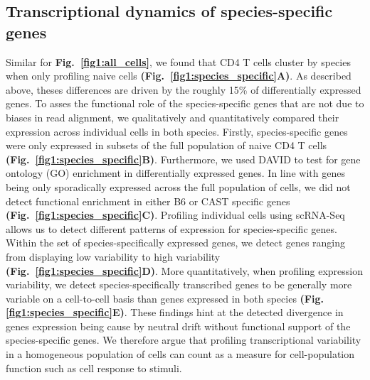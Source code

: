 \subsection{Transcriptional dynamics of species-specific genes}
\label{sec1:species-spec-dynamics}

Similar for \textbf{Fig.~\ref{fig1:all_cells}}, we found that CD4\plus{} T cells cluster by species when only profiling naive cells \textbf{(Fig.~\ref{fig1:species_specific}A)}. As described above, theses differences are driven by the roughly 15\% of differentially expressed genes. To asses the functional role of the species-specific genes that are not due to biases in read alignment, we qualitatively and quantitatively compared their expression across individual cells in both species. Firstly, species-specific genes were only expressed in subsets of the full population of naive CD4\plus{} T cells \textbf{(Fig.~\ref{fig1:species_specific}B)}. Furthermore, we used DAVID \citep{Dennis2003} to test for gene ontology (GO) enrichment in differentially expressed genes. In line with genes being only sporadically expressed across the full population of cells, we did not detect functional enrichment in either B6 or CAST specific genes \textbf{(Fig.~\ref{fig1:species_specific}C)}. Profiling individual cells using scRNA-Seq allows us to detect different patterns of expression for species-specific genes. Within the set of species-specifically expressed genes, we detect genes ranging from displaying low variability to high variability \textbf{(Fig.~\ref{fig1:species_specific}D)}. More quantitatively, when profiling expression variability, we detect species-specifically transcribed genes to be generally more variable on a cell-to-cell basis than genes expressed in both species \textbf{(Fig. \ref{fig1:species_specific}E)}. These findings hint at the detected divergence in genes expression being cause by neutral drift without functional support of the species-specific genes. We therefore argue that profiling transcriptional variability in a homogeneous population of cells can count as a measure for cell-population function such as cell response to stimuli.

\newpage

